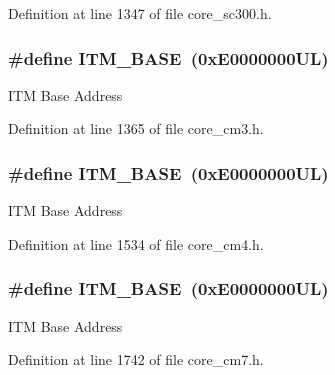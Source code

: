 Definition at line 1347 of file core\+\_\+sc300.\+h.

\subsubsection[{\texorpdfstring{I\+T\+M\+\_\+\+B\+A\+SE}{ITM_BASE}}]{\setlength{\rightskip}{0pt plus 5cm}\#define I\+T\+M\+\_\+\+B\+A\+SE~(0x\+E0000000\+U\+L)}\hypertarget{group___c_m_s_i_s__core__base_gadd76251e412a195ec0a8f47227a8359e}{}\label{group___c_m_s_i_s__core__base_gadd76251e412a195ec0a8f47227a8359e}
I\+TM Base Address 

Definition at line 1365 of file core\+\_\+cm3.\+h.

\subsubsection[{\texorpdfstring{I\+T\+M\+\_\+\+B\+A\+SE}{ITM_BASE}}]{\setlength{\rightskip}{0pt plus 5cm}\#define I\+T\+M\+\_\+\+B\+A\+SE~(0x\+E0000000\+U\+L)}\hypertarget{group___c_m_s_i_s__core__base_gadd76251e412a195ec0a8f47227a8359e}{}\label{group___c_m_s_i_s__core__base_gadd76251e412a195ec0a8f47227a8359e}
I\+TM Base Address 

Definition at line 1534 of file core\+\_\+cm4.\+h.

\subsubsection[{\texorpdfstring{I\+T\+M\+\_\+\+B\+A\+SE}{ITM_BASE}}]{\setlength{\rightskip}{0pt plus 5cm}\#define I\+T\+M\+\_\+\+B\+A\+SE~(0x\+E0000000\+U\+L)}\hypertarget{group___c_m_s_i_s__core__base_gadd76251e412a195ec0a8f47227a8359e}{}\label{group___c_m_s_i_s__core__base_gadd76251e412a195ec0a8f47227a8359e}
I\+TM Base Address 

Definition at line 1742 of file core\+\_\+cm7.\+h.

